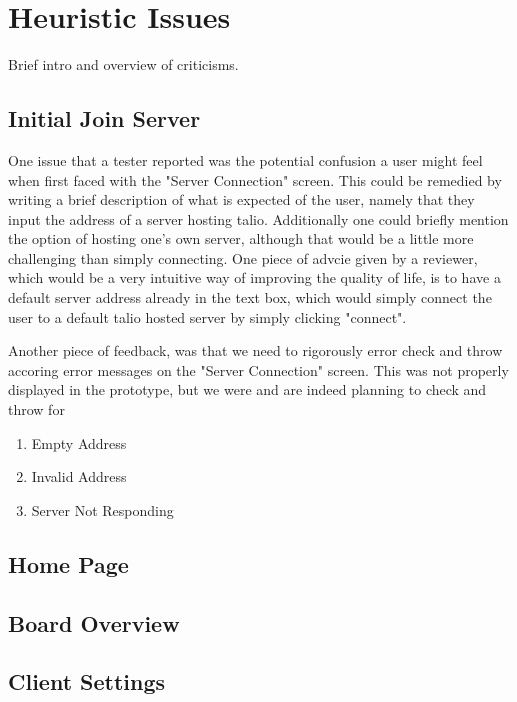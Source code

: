 \section{Heuristic Issues}

Brief intro and overview of criticisms.

\subsection{Initial Join Server}

One issue that a tester reported was the potential confusion a user might feel when first faced with the "Server Connection" screen. This could be remedied by writing a brief description of what is expected of the user, namely that they input the address of a server hosting talio. Additionally one could briefly mention the option of hosting one's own server, although that would be a little more challenging than simply connecting. One piece of advcie given by a reviewer, which would be a very intuitive way of improving the quality of life, is to have a default server address already in the text box, which would simply connect the user to a default talio hosted server by simply clicking "connect".

Another piece of feedback, was that we need to rigorously error check and throw accoring error messages on the "Server Connection" screen. This was not properly displayed in the prototype, but we were and are indeed planning to check and throw for
\begin{enumerate}
    \item Empty Address
    \item Invalid Address
    \item Server Not Responding
\end{enumerate}

\subsection{Home Page}

\subsection{Board Overview}

\subsection{Client Settings}
